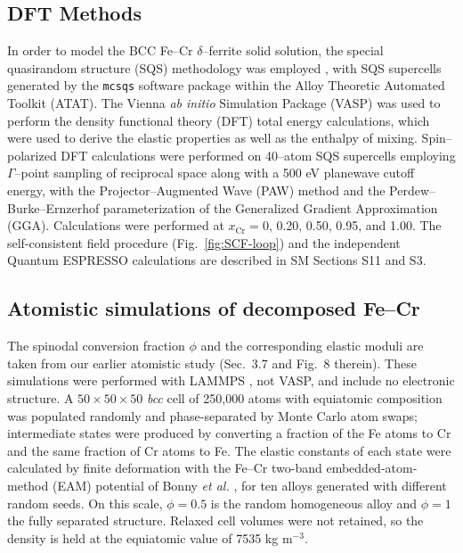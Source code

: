 \documentclass[final,3p,times]{elsarticle}
\begin{document}
\subsection{DFT Methods}
In order to model the BCC Fe--Cr $\delta$--ferrite solid solution, the special quasirandom structure (SQS) methodology was employed \cite{VandeWalleLiu2013}, with SQS supercells generated by the \texttt{mcsqs} software package within the Alloy Theoretic Automated Toolkit (ATAT).
The Vienna \textit{ab initio} Simulation Package (VASP) \cite{kresse1996vasp} was used to perform the density functional theory (DFT) total energy calculations, which were used to derive the elastic properties as well as the enthalpy of mixing.
Spin--polarized DFT calculations were performed on 40--atom SQS supercells employing $\Gamma$--point sampling of reciprocal space along with a 500 eV planewave cutoff energy, with the Projector--Augmented Wave (PAW) method \cite{kresse1999paw} and the Perdew--Burke--Ernzerhof parameterization \cite{pbe1996} of the Generalized Gradient Approximation (GGA). Calculations were performed at $x_{\mathrm{Cr}} = 0$, 0.20, 0.50, 0.95, and 1.00. The self-consistent field procedure (Fig.~\ref{fig:SCF-loop}) and the independent Quantum ESPRESSO calculations are described in SM Sections S11 and S3.


\subsection{Atomistic simulations of decomposed Fe--Cr}
\label{sec:md}
The spinodal conversion fraction $\phi$ and the corresponding elastic moduli are taken from our earlier atomistic study \cite{al2023detecting} (Sec.~3.7 and Fig.~8 therein). These simulations were performed with LAMMPS \cite{plimpton1995}, not VASP, and include no electronic structure. A $50\times50\times50$ \textit{bcc} cell of 250,000 atoms with equiatomic composition was populated randomly and phase-separated by Monte Carlo atom swaps; intermediate states were produced by converting a fraction of the Fe atoms to Cr and the same fraction of Cr atoms to Fe. The elastic constants of each state were calculated by finite deformation with the Fe--Cr two-band embedded-atom-method (EAM) potential of Bonny \textit{et al.} \cite{bonny2011iron}, for ten alloys generated with different random seeds. On this scale, $\phi=0.5$ is the random homogeneous alloy and $\phi=1$ the fully separated structure. Relaxed cell volumes were not retained, so the density is held at the equiatomic value of 7535 kg m$^{-3}$.
\end{document}
